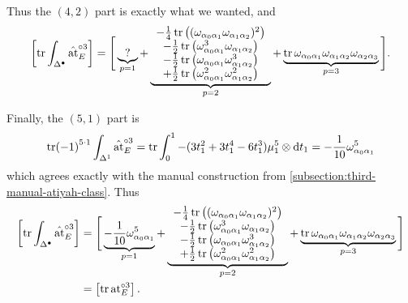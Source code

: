 \documentclass[11pt,fleqn]{article}
\theoremstyle{plain}
\theoremstyle{definition}
\theoremstyle{remark}
\numberwithin{equation}{theorem}
\newcommand{\at}{\mathrm{at}}
\newcommand{\expat}[1]{\at^{\circ#1}}
\newcommand{\simpexpat}[1]{\hat{\at}^{\circ#1}}
\renewcommand{\d}{\mathrm{d}}
\begin{document}
        Thus the $(4,2)$ part is exactly what we wanted, and
        \begin{equation}
            \left[\tr\int_{\Delta^\bullet}\simpexpat{3}_E\right] = \Bigg[\underbrace{?}_{p=1}
            +\underbrace{%
                \begin{array}{c}
                    - \frac14\tr\big((\omega_{\alpha_0\alpha_1}\omega_{\alpha_1\alpha_2})^2\big)\\
                    - \frac12\tr\big(\omega_{\alpha_0\alpha_1}^3\omega_{\alpha_1\alpha_2}\big)\\
                    - \frac12\tr\big(\omega_{\alpha_0\alpha_1}\omega_{\alpha_1\alpha_2}^3\big)\\
                    + \frac12\tr\left(\omega_{\alpha_0\alpha_1}^2\omega_{\alpha_1\alpha_2}^2\right)
                \end{array}
            }_{p=2}
            + \underbrace{\tr\omega_{\alpha_0\alpha_1}\omega_{\alpha_1\alpha_2}\omega_{\alpha_2\alpha_3}}_{p=3}\Bigg].
        \end{equation}

        Finally, the $(5,1)$ part is
        \begin{equation}
            \tr(-1)^{5\cdot1}\int_{\Delta^1}\simpexpat{3}_E
            = \tr\int_0^1-(3t_1^2+ 3t_1^4 - 6t_1^3)\mu_1^5\otimes\d t_1
            = -\frac{1}{10}\omega_{\alpha_0\alpha_1}^5
        \end{equation}
        which agrees exactly with the manual construction from \cref{subsection:third-manual-atiyah-class}.
        Thus
        \begin{align}
            \left[\tr\int_{\Delta^\bullet}\simpexpat{3}_E\right]
            &=
            \Bigg[\underbrace{-\frac{1}{10}\omega_{\alpha_0\alpha_1}^5}_{p=1}
            +\underbrace{%
                \begin{array}{c}
                    - \frac14\tr\big((\omega_{\alpha_0\alpha_1}\omega_{\alpha_1\alpha_2})^2\big)\\
                    - \frac12\tr\big(\omega_{\alpha_0\alpha_1}^3\omega_{\alpha_1\alpha_2}\big)\\
                    - \frac12\tr\big(\omega_{\alpha_0\alpha_1}\omega_{\alpha_1\alpha_2}^3\big)\\
                    + \frac12\tr\left(\omega_{\alpha_0\alpha_1}^2\omega_{\alpha_1\alpha_2}^2\right)
                \end{array}
            }_{p=2}
            + \underbrace{\tr\omega_{\alpha_0\alpha_1}\omega_{\alpha_1\alpha_2}\omega_{\alpha_2\alpha_3}}_{p=3}\Bigg]
        \nonumber
        \\  &= \left[\tr\expat{3}_E\right].
        \end{align}
\end{document}
